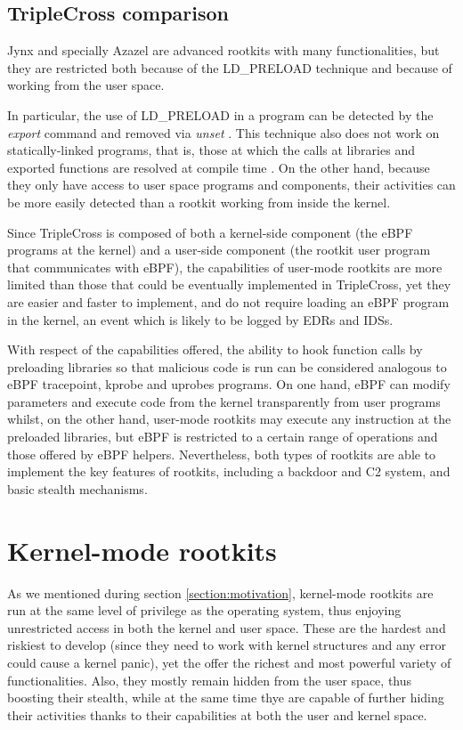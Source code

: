 \subsection{TripleCross comparison}
Jynx and specially Azazel are advanced rootkits with many functionalities, but they are restricted both because of the LD\_PRELOAD technique and because of working from the user space.

In particular, the use of LD\_PRELOAD in a program can be detected by the \textit{export} command and removed via \textit{unset} \cite{ld_preload_detect}. This technique also does not work on statically-linked programs, that is, those at which the calls at libraries and exported functions are resolved at compile time \cite{ldpreload_pros}. On the other hand, because they only have access to user space programs and components, their activities can be more easily detected than a rootkit working from inside the kernel.

Since TripleCross is composed of both a kernel-side component (the eBPF programs at the kernel) and a user-side component (the rootkit user program that communicates with eBPF), the capabilities of user-mode rootkits are more limited than those that could be eventually implemented in TripleCross, yet they are easier and faster to implement, and do not require loading an eBPF program in the kernel, an event which is likely to be logged by EDRs and IDSs. 

With respect of the capabilities offered, the ability to hook function calls by preloading libraries so that malicious code is run can be considered analogous to eBPF tracepoint, kprobe and uprobes programs. On one hand, eBPF can modify parameters and execute code from the kernel transparently from user programs whilst, on the other hand, user-mode rootkits may execute any instruction at the preloaded libraries, but eBPF is restricted to a certain range of operations and those offered by eBPF helpers. Nevertheless, both types of rootkits are able to implement the key features of rootkits, including a backdoor and C2 system, and basic stealth mechanisms.

\section{Kernel-mode rootkits}
As we mentioned during section \ref{section:motivation}, kernel-mode rootkits are run at the same level of privilege as the operating system, thus enjoying unrestricted access in both the kernel and user space. These are the hardest and riskiest to develop (since they need to work with kernel structures and any error could cause a kernel panic), yet the offer the richest and most powerful variety of functionalities. Also, they mostly remain hidden from the user space, thus boosting their stealth, while at the same time thye are capable of  further hiding their activities thanks to their capabilities at both the user and kernel space.

